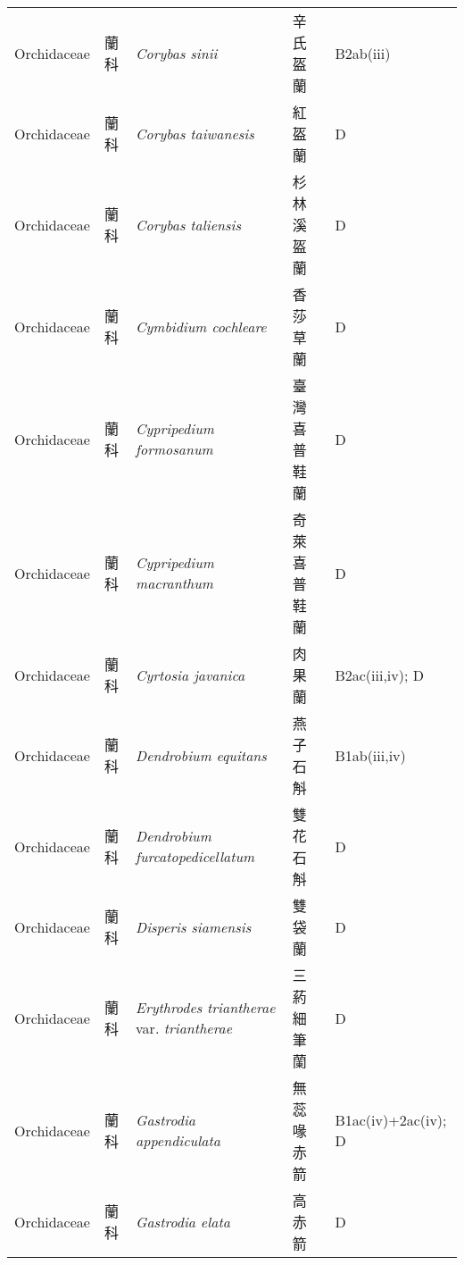{\begin{longtable}{p{2.5cm}p{2.5cm}p{4.5cm}p{2.5cm}p{3cm}}
    Orchidaceae & 蘭科 & \textit{Corybas sinii}  & 辛氏盔蘭 & B2ab(iii) \index{Corybas@\textit{Corybas}!sinii@\textit{sinii}}  \index{辛氏盔蘭} \\
    Orchidaceae & 蘭科 & \textit{Corybas taiwanesis}  & 紅盔蘭 & D \index{Corybas@\textit{Corybas}!taiwanesis@\textit{taiwanesis}}  \index{紅盔蘭} \\
    Orchidaceae & 蘭科 & \textit{Corybas taliensis}  & 杉林溪盔蘭 & D \index{Corybas@\textit{Corybas}!taliensis@\textit{taliensis}}  \index{杉林溪盔蘭} \\
    Orchidaceae & 蘭科 & \textit{Cymbidium cochleare}  & 香莎草蘭 & D \index{Cymbidium@\textit{Cymbidium}!cochleare@\textit{cochleare}}  \index{香莎草蘭} \\
    Orchidaceae & 蘭科 & \textit{Cypripedium formosanum}  & 臺灣喜普鞋蘭 & D \index{Cypripedium@\textit{Cypripedium}!formosanum@\textit{formosanum}}  \index{臺灣喜普鞋蘭} \\
    Orchidaceae & 蘭科 & \textit{Cypripedium macranthum}  & 奇萊喜普鞋蘭 & D \index{Cypripedium@\textit{Cypripedium}!macranthum@\textit{macranthum}}  \index{奇萊喜普鞋蘭} \\
    Orchidaceae & 蘭科 & \textit{Cyrtosia javanica}  & 肉果蘭 & B2ac(iii,iv); D \index{Cyrtosia@\textit{Cyrtosia}!javanica@\textit{javanica}}  \index{肉果蘭} \\
    Orchidaceae & 蘭科 & \textit{Dendrobium equitans}  & 燕子石斛 & B1ab(iii,iv) \index{Dendrobium@\textit{Dendrobium}!equitans@\textit{equitans}}  \index{燕子石斛} \\
    Orchidaceae & 蘭科 & \textit{Dendrobium furcatopedicellatum}  & 雙花石斛 & D \index{Dendrobium@\textit{Dendrobium}!furcatopedicellatum@\textit{furcatopedicellatum}}  \index{雙花石斛} \\
    Orchidaceae & 蘭科 & \textit{Disperis siamensis}  & 雙袋蘭 & D \index{Disperis@\textit{Disperis}!siamensis@\textit{siamensis}}  \index{雙袋蘭} \\
    Orchidaceae & 蘭科 & \textit{Erythrodes triantherae} var. \textit{triantherae}  & 三葯細筆蘭 & D \index{Erythrodes@\textit{Erythrodes}!triantherae@\textit{triantherae}!var. triantherae@var. \textit{triantherae}}  \index{三葯細筆蘭} \\
    Orchidaceae & 蘭科 & \textit{Gastrodia appendiculata}  & 無蕊喙赤箭 & B1ac(iv)+2ac(iv); D \index{Gastrodia@\textit{Gastrodia}!appendiculata@\textit{appendiculata}}  \index{無蕊喙赤箭} \\
    Orchidaceae & 蘭科 & \textit{Gastrodia elata}  & 高赤箭 & D \index{Gastrodia@\textit{Gastrodia}!elata@\textit{elata}}  \index{高赤箭} \\

\end{longtable}}
